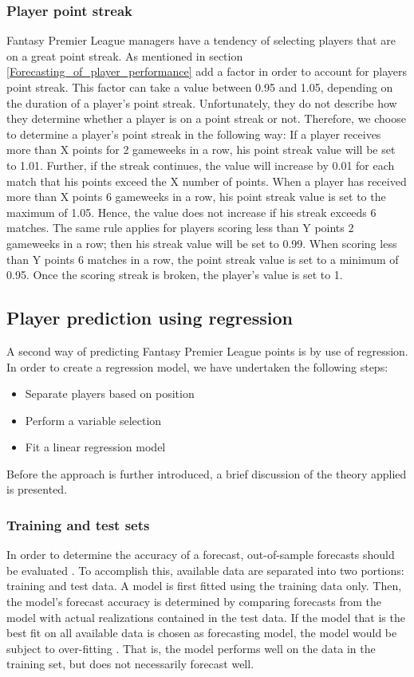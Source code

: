 \subsubsection{Player point streak}
Fantasy Premier League managers have a tendency of selecting players that are on a great point streak. As mentioned in section \ref{Forecasting_of_player_performance} \cite{Bonomo} add a factor in order to account for players point streak. This factor can take a value between 0.95 and 1.05, depending on the duration of a player's point streak. Unfortunately, they do not describe how they determine whether a player is on a point streak or not. Therefore, we choose to determine a player's point streak in the following way: 
\newpar
If a player receives more than X points for 2 gameweeks in a row, his point streak value will be set to 1.01. Further, if the streak continues, the value will increase by 0.01 for each match that his points exceed the X number of points. When a player has received more than X points 6 gameweeks in a row, his point streak value is set to the maximum of 1.05. Hence, the value does not increase if his streak exceeds 6 matches. The same rule applies for players scoring less than Y points 2 gameweeks in a row; then his streak value will be set to 0.99. When scoring less than Y points 6 matches in a row, the point streak value is set to a minimum of 0.95. Once the scoring streak is broken, the player's value is set to 1. 


\subsection{Player prediction using regression}
\label{Sol_approach_regression}

A second way of predicting Fantasy Premier League points is by use of regression. In order to create a regression model, we have undertaken the following steps:
\begin{itemize}
    \item Separate players based on position
    \item Perform a variable selection
    \item Fit a linear regression model
\end{itemize}
Before the approach is further introduced, a brief discussion of the theory applied is presented.


\subsubsection{Training and test sets}
In order to determine the accuracy of a forecast, out-of-sample forecasts should be evaluated \citep{Hyndman}. To accomplish this, available data are separated into two portions: training and test data. A model is first fitted using the training data only. Then, the model's forecast accuracy is determined by comparing forecasts from the model with actual realizations contained in the test data. 
If the model that is the best fit on all available data is chosen as forecasting model, the model would be subject to over-fitting \citep{Hyndman}. That is, the model performs well on the data in the training set, but does not necessarily forecast well.

